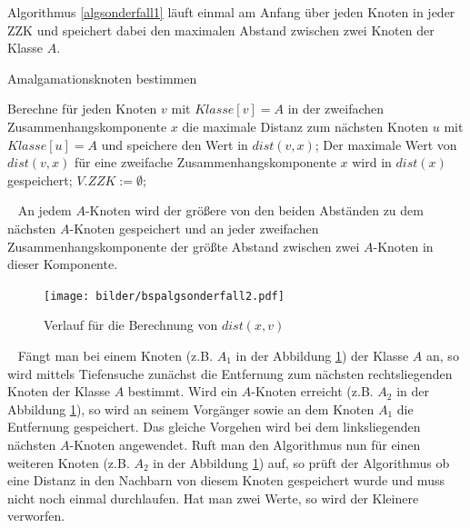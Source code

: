 Algorithmus \ref{algsonderfall1} läuft einmal am Anfang über jeden Knoten in jeder ZZK und speichert dabei den maximalen Abstand zwischen zwei Knoten der Klasse $A$.\\
\vspace{-5mm}
\begin{algorithm}
\caption{Amalgamationsknoten bestimmen}
\begin{algorithmic}[1]
\vspace{2mm}
\STATE Berechne für jeden Knoten $v$ mit $Klasse[v]=A$ in der zweifachen Zusammenhangskomponente $x$ die maximale Distanz zum nächsten Knoten $u$ mit $Klasse[u]=A$ und speichere den Wert in $dist(v,x)$;
\STATE Der maximale Wert von $dist(v,x)$ für eine zweifache Zusammenhangskomponente $x$ wird in $dist(x)$ gespeichert;
\STATE $V.ZZK:= \emptyset$;
\ENDFOR
\vspace{2mm}
\end{algorithmic}
\label{algsonderfall1}
\end{algorithm}
\vspace{-4mm}
~\linebreak
An jedem $A$-Knoten wird der größere von den beiden Abständen zu dem nächsten $A$-Knoten gespeichert und an jeder zweifachen Zusammenhangskomponente der größte Abstand zwischen zwei $A$-Knoten in dieser Komponente.\\
\vspace{-2mm}
\begin{figure}[h!]
\centering
\texttt{[image: bilder/bspalgsonderfall2.pdf]}
\caption{Verlauf für die Berechnung von $dist(x,v)$}
\label{bild:distberechnung}
\end{figure}
\vspace{-2mm}
~\linebreak
Fängt man bei einem Knoten (z.B. $A_1$ in der Abbildung \ref{bild:distberechnung}) der Klasse $A$ an, so wird mittels Tiefensuche zunächst die Entfernung zum nächsten rechtsliegenden Knoten der Klasse $A$ bestimmt. Wird ein $A$-Knoten erreicht (z.B. $A_2$ in der Abbildung \ref{bild:distberechnung}), so wird an seinem Vorgänger sowie an dem Knoten $A_1$ die Entfernung gespeichert. Das gleiche Vorgehen wird bei dem linksliegenden nächsten $A$-Knoten angewendet. Ruft man den Algorithmus nun für einen weiteren Knoten (z.B. $A_2$ in der Abbildung \ref{bild:distberechnung}) auf, so prüft der Algorithmus ob eine Distanz in den Nachbarn von diesem Knoten gespeichert wurde und muss nicht noch einmal durchlaufen. Hat man zwei Werte, so wird der Kleinere verworfen.
